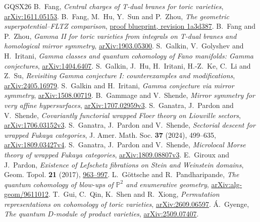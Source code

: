 \begin{thebibliography}{GQSX26}
 B.~Fang, \emph{Central charges of T-dual branes for toric varieties}, \href{https://arxiv.org/abs/1611.05153}{arXiv:1611.05153}.
 B.~Fang, M.~Hu, Y.~Sun and P.~Zhou, \emph{The geometric superpotential--FLTZ comparison}, \href{https://github.com/bohanfang/fs-fltz-minimal/blob/1a3d387cfacc746e25aad31e5b27b1803103e7cb/proof-blueprint.pdf}{proof blueprint, revision 1a3d387}.
 B.~Fang and P.~Zhou, \emph{Gamma II for toric varieties from integrals on T-dual branes and homological mirror symmetry}, \href{https://arxiv.org/abs/1903.05300}{arXiv:1903.05300}.
 S.~Galkin, V.~Golyshev and H.~Iritani, \emph{Gamma classes and quantum cohomology of Fano manifolds: Gamma conjectures}, \href{https://arxiv.org/abs/1404.6407}{arXiv:1404.6407}.
 S.~Galkin, J.~Hu, H.~Iritani, H.-Z.~Ke, C.~Li and Z.~Su, \emph{Revisiting Gamma conjecture I: counterexamples and modifications}, \href{https://arxiv.org/abs/2405.16979}{arXiv:2405.16979}.
 S.~Galkin and H.~Iritani, \emph{Gamma conjecture via mirror symmetry}, \href{https://arxiv.org/abs/1508.00719}{arXiv:1508.00719}.
 B.~Gammage and V.~Shende, \emph{Mirror symmetry for very affine hypersurfaces}, \href{https://arxiv.org/abs/1707.02959v3}{arXiv:1707.02959v3}.
 S.~Ganatra, J.~Pardon and V.~Shende, \emph{Covariantly functorial wrapped Floer theory on Liouville sectors}, \href{https://arxiv.org/abs/1706.03152v3}{arXiv:1706.03152v3}.
 S.~Ganatra, J.~Pardon and V.~Shende, \emph{Sectorial descent for wrapped Fukaya categories}, J. Amer. Math. Soc. \textbf{37} (2024), 499--635, \href{https://arxiv.org/abs/1809.03427v4}{arXiv:1809.03427v4}.
 S.~Ganatra, J.~Pardon and V.~Shende, \emph{Microlocal Morse theory of wrapped Fukaya categories}, \href{https://arxiv.org/abs/1809.08807v3}{arXiv:1809.08807v3}.
 E.~Giroux and J.~Pardon, \emph{Existence of Lefschetz fibrations on Stein and Weinstein domains}, Geom. Topol. \textbf{21} (2017), \href{https://arxiv.org/abs/1411.6176}{963--997}.
 L.~G\"ottsche and R.~Pandharipande, \emph{The quantum cohomology of blow-ups of $\mathbb P^2$ and enumerative geometry}, \href{https://arxiv.org/abs/alg-geom/9611012}{arXiv:alg-geom/9611012}.
 T.~Gui, C.~Qin, K.~Shen and R.~Xiong, \emph{Permutation representations on cohomology of toric varieties}, \href{https://arxiv.org/abs/2609.06597}{arXiv:2609.06597}.
 \'A.~Gyenge, \emph{The quantum $D$-module of product varieties}, \href{https://arxiv.org/abs/2509.07407}{arXiv:2509.07407}.

\end{thebibliography}
